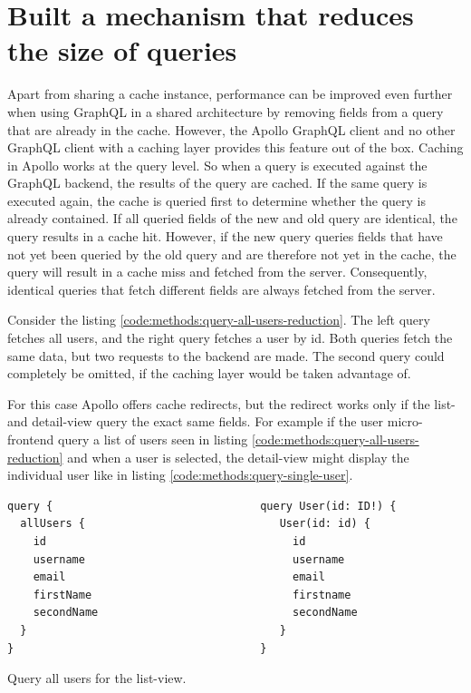 \section{Built a mechanism that reduces the size of queries}

Apart from sharing a cache instance, performance can be improved even further when using GraphQL in a shared architecture by removing fields from a query that are already in the cache.
However, the Apollo GraphQL client and no other GraphQL client with a caching layer provides this feature out of the box. Caching in Apollo works at the query level. So when a query is executed against the GraphQL backend, the results of the query are cached. If the same query is executed again, the cache is queried first to determine whether the query is already contained. If all queried fields of the new and old query are identical, the query results in a cache hit. However, if the new query queries fields that have not yet been queried by the old query and are therefore not yet in the cache, the query will result in a cache miss and fetched from the server. Consequently, identical queries that fetch different fields are always fetched from the server.

Consider the listing \ref{code:methods:query-all-users-reduction}. The left query fetches all users, and the right query fetches a user by id. Both queries fetch the same data, but two requests to the backend are made. The second query could completely be omitted, if the caching layer would be taken advantage of.

For this case Apollo offers cache redirects, but the redirect works only if the list- and detail-view query the exact same fields. For example if the user micro-frontend query a list of users seen in listing \ref{code:methods:query-all-users-reduction} and when a user is selected, the detail-view might display the individual user like in listing \ref{code:methods:query-single-user}.

\ifshowListings
\begin{listing}[H]
\begin{verbatim}
query {                                query User(id: ID!) {
  allUsers {                              User(id: id) {
    id                                      id
    username                                username
    email                                   email
    firstName                               firstname
    secondName                              secondName
  }                                       }    
}                                      }
\end{verbatim}
\caption{Query all users for the list-view.}\label{code:methods:query-all-users-reduction}
\end{listing}
\fi

